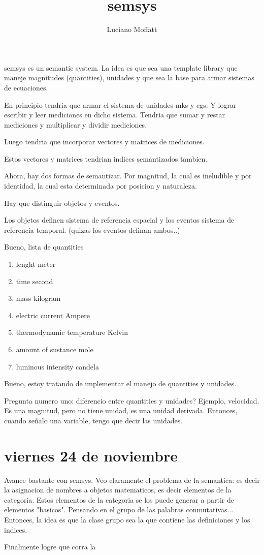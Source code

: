 \documentclass{article}
\author{Luciano Moffatt}
\begin{document}
\title{semsys}

semsys es un semantic system. La idea es que sea una template library que maneje magnitudes (quantities), unidades y que sea la base para armar sistemas de ecuaciones. 

En principio tendria que armar el sistema de unidades mks y cgs. 
Y lograr escribir y leer mediciones en dicho sistema. 
Tendria que sumar y restar mediciones y multiplicar y dividir mediciones. 

Luego tendria que incorporar vectores y matrices de mediciones. 

Estos vectores y matrices tendrian indices semantizados tambien. 

Ahora, hay dos formas de semantizar. 
Por magnitud, la cual es ineludible y por identidad, la cual esta determinada por posicion y naturaleza. 

Hay que distinguir objetos y eventos. 

Los objetos definen sistema de referencia espacial y los eventos sistema de referencia temporal. 
(quizas los eventos definan ambos..)


Bueno, lista de quantities
\begin{enumerate}
\item lenght meter
\item time second
\item mass kilogram
\item electric current Ampere
\item thermodynamic temperature Kelvin
\item amount of sustance mole
\item luminous intensity candela
\end{enumerate}


Bueno, estoy tratando de implementar el manejo de quantities y unidades. 

Pregunta numero uno: 
diferencio entre quantities y unidades?
Ejemplo, velocidad. Es una magnitud, pero no tiene unidad, es una unidad derivada. 
Entonces, cuando señalo una variable, tengo que decir las unidades. 


\section{viernes 24 de noviembre}
Avance bastante con semsys. 
Veo claramente el problema de la semantica: es decir la asignacion de nombres a objetos matematicos, es decir elementos de la categoria. 
Estos elementos de la categoria se los puede generar a partir de elementos "basicos". Pensando en el grupo de las palabras conmutativas... 
Entonces, la idea es que la clase grupo sea la que contiene las definiciones y los indices. 


Finalmente logre que corra la 
\end{document}
